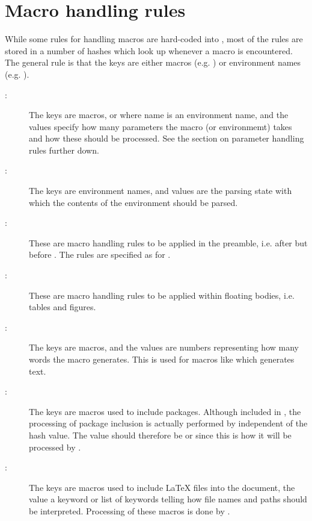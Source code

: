 \documentclass{article}
\begin{document}
\section{Macro handling rules}

While some rules for handling macros are hard-coded into \TeXcount{}, most of the rules are stored in a number of hashes which \TeXcount{} look up whenever a macro is encountered. The general rule is that the keys are either macros (e.g. ) or environment names (e.g. ).

\begin{description}

\item[:] The keys are macros, or  where name is an environment name, and the values specify how many parameters the macro (or environmemt) takes and how these should be processed. See the section on parameter handling rules further down.

\item[:] The keys are environment names, and values are the parsing state with which the contents of the environment should be parsed.

\item[:] These are macro handling rules to be applied in the preamble, i.e. after  but before . The rules are specified as for .

\item[:] These are macro handling rules to be applied within floating bodies, i.e. tables and figures.

\item[:] The keys are macros, and the values are numbers representing how many words the macro generates. This is used for macros like  which generates text.

\item[:] The keys are macros used to include packages. Although included in , the processing of package inclusion is actually performed by  independent of the hash value. The value should therefore be  or  since this is how it will be processed by .

\item[:] The keys are macros used to include \LaTeX{} files into the document, the value a keyword or list of keywords telling how file names and paths should be interpreted. Processing of these macros is done by .

\end{description}
\end{document}
